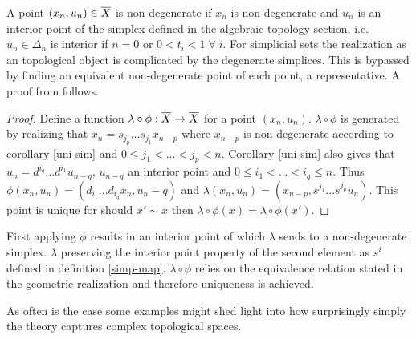 \documentclass[../../main.tex]{subfiles}
\begin{document}
    A point $(x_n,u_n)\in \overline X$ is non-degenerate if $x_n$ is non-degenerate and $u_n$ is an interior point of the simplex defined in the algebraic topology section, i.e. $u_n\in \Delta_n$ is interior if $ n=0$ or $ 0< t_i < 1 \;\forall\; i$. For simplicial sets the realization as an topological object is complicated by the degenerate simplices. This is bypassed by finding an equivalent non-degenerate point of each point, a representative. A proof from \cite{simp-maye} follows. 

    \begin{proof}    
        Define a function $\lambda\circ\phi:\overline X \to \overline X$ for a point $(x_n,u_n)$. $\lambda\circ\phi$ is generated by realizing that $x_n=s_{j_p}...s_{j_1}x_{n-p}$ where $x_{n-p}$ is non-degenerate according to corollary \ref{uni-sim} and $0\leq j_1<...<j_p<n$. Corollary \ref{uni-sim} also gives that $u_n=d^{i_q}...d^{i_1}u_{n-q}$, $u_{n-q}$ an interior point and $0\leq i_1<...<i_q\leq n$. Thus $\phi(x_n,u_n)=(d_{i_1}...d_{i_q}x_n,u_n-q)$ and $\lambda(x_n,u_n)=(x_{n-p},s^{j_1}...s^{j_p}u_n)$. This point is unique for should $x'\sim x$ then $\lambda\circ\phi(x)=\lambda\circ\phi(x')$.
    \end{proof}
    
    First applying $\phi$ results in an interior point of which $\lambda$ sends to a non-degenerate simplex. $\lambda$ preserving the interior point property of the second element as $s^i$ defined in definition \ref{simp-map}. $\lambda\circ\phi$ relies on the equivalence relation stated in the geometric realization and therefore uniqueness is achieved.  

    As often is the case some examples might shed light into how surprisingly simply the theory captures complex topological spaces.

\end{document}
